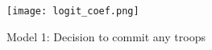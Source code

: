 			\begin{figure}[H]
				\centering
					\texttt{[image: logit\_coef.png]}
				\caption{Model 1: Decision to commit any troops}
				\label{fig:logit_reg}
			\end{figure}
